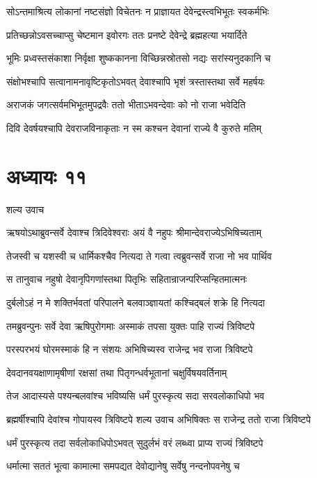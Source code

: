 \twolineshloka
{सोऽन्तमाश्रित्य लोकानां नष्टसंज्ञो विचेतनः}
{न प्राज्ञायत देवेन्द्रस्त्वभिभूतः स्वकर्मभिः}


\twolineshloka
{प्रतिच्छन्नोऽवसच्चाप्सु चेष्टमान इवोरगः}
{ततः प्रनष्टे देवेन्द्रे ब्रह्महत्या भयार्दिते}


\twolineshloka
{भूमिः प्रध्वस्तसंकाशा निर्वृक्षा शुष्ककानना}
{विच्छिन्नस्रोतसो नद्यः सरांस्यनुदकानि च}


\twolineshloka
{संक्षोभश्चापि सत्वानामनावृष्टिकृतोऽभवत्}
{देवाश्चापि भृशं त्रस्तास्तथा सर्वे महर्षयः}


\twolineshloka
{अराजकं जगत्सर्वमभिभूतमुपद्रवैः}
{ततो भीताऽभवन्देवाः को नो राजा भवेदिति}


\twolineshloka
{दिवि देवर्षयश्चापि देवराजविनाकृताः}
{न स्म कश्चन देवानां राज्ये वै कुरुते मतिम्}


\chapter{अध्यायः ११}
\twolineshloka
{शल्य उवाच}
{}


\twolineshloka
{ऋषयोऽथाब्रुवन्सर्वे देवाश्च त्रिदिवेश्वराः}
{अयं वै नहुपः श्रीमान्देवराज्येऽभिषिच्यताम्}


\twolineshloka
{तेजस्वी च यशस्वी च धार्मिकश्चैव नित्यदा}
{ते गत्वा त्वब्रुवन्सर्वे राजा नो भव पार्थिव}


\twolineshloka
{स तानुवाच नहुषो देवानृपिगणांस्तथा}
{पितृभिः सहितान्राजन्परिप्सन्हितमात्मनः}


\twolineshloka
{दुर्बलोऽहं न मे शक्तिर्भवतां परिपालने}
{बलवाञ्ज्ञायतां कश्चिद्बलं शक्रे हि नित्यदा}


\twolineshloka
{तमब्रुवन्पुनः सर्वे देवा ऋषिपुरोगमाः}
{अस्माकं तपसा युक्तः पाहि राज्यं त्रिविष्टपे}


\twolineshloka
{परस्परभयं घोरमस्माकं हि न संशयः}
{अभिषिच्यस्व राजेन्द्र भव राजा त्रिविष्टपे}


\threelineshloka
{देवदानवयक्षाणामृषीणां रक्षसां तथा}
{पितृगन्धर्वभूतानां चक्षुर्विषयवर्तिनाम्}
{}


\twolineshloka
{तेज आदास्यसे पश्यन्बलवांश्च भविष्यसि}
{धर्मं पुरस्कृत्य सदा सरवलोकाधिपो भव}


\threelineshloka
{ब्रह्मर्षीश्चापि देवांश्च गोपायस्व त्रिविष्टपे}
{शल्य उवाच}
{अभिषिक्तः स राजेन्द्र ततो राजा त्रिविष्टपे}


\twolineshloka
{धर्मं पुरस्कृत्य तदा सर्वलोकाधिपोऽभवत्}
{सुदुर्लभं वरं लब्ध्वा प्राप्य राज्यं त्रिविष्टपे}


\twolineshloka
{धर्मात्मा सततं भूत्वा कामात्मा समपद्यत}
{देवोद्यानेषु सर्वेषु नन्दनोपवनेषु च}


